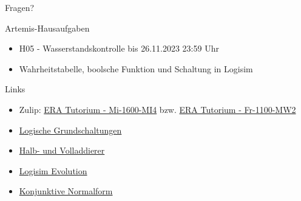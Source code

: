 \documentclass[
  german,            %
  aspectratio=169,    %
]{tumbeamer}
\begin{document}
\begin{frame}[c]{}{}
  \begin{center}
    \LARGE Fragen?
  \end{center}
\end{frame}

\begin{frame}[c]{Artemis-Hausaufgaben}{}
  \begin{itemize}
    \item H05 - Wasserstandskontrolle bis 26.11.2023 23:59 Uhr
    \item Wahrheitstabelle, boolsche Funktion und Schaltung in Logisim
  \end{itemize}
\end{frame}

\begin{frame}[fragile, c]{Links}{}
  \begin{itemize}
    \item Zulip: \href{https://zulip.in.tum.de/#narrow/stream/1917-ERA-Tutorium---Mi-1600-MI4}{\glqq ERA Tutorium - Mi-1600-MI4\grqq}
          bzw. \href{https://zulip.in.tum.de/#narrow/stream/1940-ERA-Tutorium---Fr-1100-MW2}{\glqq ERA Tutorium - Fr-1100-MW2\grqq}
    \item \href{https://www.elektronik-kompendium.de/sites/dig/2609191.htm}{Logische Grundschaltungen}
    \item \href{https://www.elektronik-kompendium.de/sites/dig/0209031.htm}{Halb- und Volladdierer}
    \item \href{https://github.com/logisim-evolution/logisim-evolution/releases}{Logisim Evolution}
    \item \href{https://www.biancahoegel.de/logik/normalform_konjunktiv.html}{Konjunktive Normalform}
  \end{itemize}
\end{frame}

\maketitle
\end{document}
